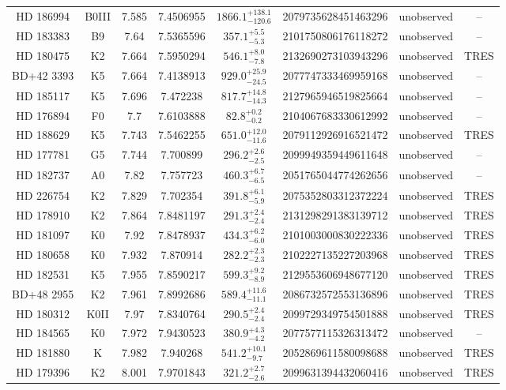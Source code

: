 \begin{table*}
\begin{tabular}{cccccccc}
HD 186994 & B0III & 7.585 & 7.4506955 & $1866.1^{+138.1}_{-120.6}$ & 2079735628451463296 & unobserved & -- \\
HD 183383 & B9 & 7.64 & 7.5365596 & $357.1^{+5.5}_{-5.3}$ & 2101750806176118272 & unobserved & -- \\
HD 180475 & K2 & 7.664 & 7.5950294 & $546.1^{+8.0}_{-7.8}$ & 2132690273103943296 & unobserved & TRES \\
BD+42 3393 & K5 & 7.664 & 7.4138913 & $929.0^{+25.9}_{-24.5}$ & 2077747333469959168 & unobserved & -- \\
HD 185117 & K5 & 7.696 & 7.472238 & $817.7^{+14.8}_{-14.3}$ & 2127965946519825664 & unobserved & -- \\
HD 176894 & F0 & 7.7 & 7.6103888 & $82.8^{+0.2}_{-0.2}$ & 2104067683330612992 & unobserved & -- \\
HD 188629 & K5 & 7.743 & 7.5462255 & $651.0^{+12.0}_{-11.6}$ & 2079112926916521472 & unobserved & TRES \\
HD 177781 & G5 & 7.744 & 7.700899 & $296.2^{+2.6}_{-2.5}$ & 2099949359449611648 & unobserved & -- \\
HD 182737 & A0 & 7.82 & 7.757723 & $460.3^{+6.7}_{-6.5}$ & 2051765044774262656 & unobserved & -- \\
HD 226754 & K2 & 7.829 & 7.702354 & $391.8^{+6.1}_{-5.9}$ & 2075352803312372224 & unobserved & TRES \\
HD 178910 & K2 & 7.864 & 7.8481197 & $291.3^{+2.4}_{-2.4}$ & 2131298291383139712 & unobserved & TRES \\
HD 181097 & K0 & 7.92 & 7.8478937 & $434.3^{+6.2}_{-6.0}$ & 2101003000830222336 & unobserved & TRES \\
HD 180658 & K0 & 7.932 & 7.870914 & $282.2^{+2.3}_{-2.3}$ & 2102227135227203968 & unobserved & TRES \\
HD 182531 & K5 & 7.955 & 7.8590217 & $599.3^{+9.2}_{-8.9}$ & 2129553606948677120 & unobserved & TRES \\
BD+48 2955 & K2 & 7.961 & 7.8992686 & $589.4^{+11.6}_{-11.1}$ & 2086732572553136896 & unobserved & TRES \\
HD 180312 & K0II & 7.97 & 7.8340764 & $290.5^{+2.4}_{-2.4}$ & 2099729349754501888 & unobserved & TRES \\
HD 184565 & K0 & 7.972 & 7.9430523 & $380.9^{+4.3}_{-4.2}$ & 2077577115326313472 & unobserved & -- \\
HD 181880 & K & 7.982 & 7.940268 & $541.2^{+10.1}_{-9.7}$ & 2052869611580098688 & unobserved & TRES \\
HD 179396 & K2 & 8.001 & 7.9701843 & $321.2^{+2.7}_{-2.6}$ & 2099631394432060416 & unobserved & TRES \\

\end{tabular}
\end{table*}
